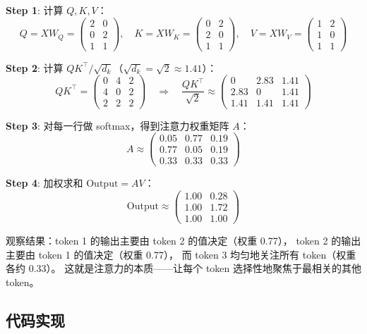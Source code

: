 \textbf{Step 1}: 计算 $Q, K, V$：
\[
Q = XW_Q = \begin{pmatrix} 2 & 0 \\ 0 & 2 \\ 1 & 1 \end{pmatrix}, \quad
K = XW_K = \begin{pmatrix} 0 & 2 \\ 2 & 0 \\ 1 & 1 \end{pmatrix}, \quad
V = XW_V = \begin{pmatrix} 1 & 2 \\ 1 & 0 \\ 1 & 1 \end{pmatrix}
\]

\textbf{Step 2}: 计算 $QK^\top / \sqrt{d_k}$（$\sqrt{d_k} = \sqrt{2} \approx 1.41$）：
\[
QK^\top = \begin{pmatrix} 0 & 4 & 2 \\ 4 & 0 & 2 \\ 2 & 2 & 2 \end{pmatrix}
\quad \Rightarrow \quad
\frac{QK^\top}{\sqrt{2}} \approx \begin{pmatrix} 0 & 2.83 & 1.41 \\ 2.83 & 0 & 1.41 \\ 1.41 & 1.41 & 1.41 \end{pmatrix}
\]

\textbf{Step 3}: 对每一行做 softmax，得到注意力权重矩阵 $A$：
\[
A \approx \begin{pmatrix}
  0.05 & 0.77 & 0.19 \\
  0.77 & 0.05 & 0.19 \\
  0.33 & 0.33 & 0.33
\end{pmatrix}
\]

\textbf{Step 4}: 加权求和 $\mathrm{Output} = AV$：
\[
\mathrm{Output} \approx \begin{pmatrix}
  1.00 & 0.28 \\
  1.00 & 1.72 \\
  1.00 & 1.00
\end{pmatrix}
\]

观察结果：token 1 的输出主要由 token 2 的值决定（权重 0.77），
token 2 的输出主要由 token 1 的值决定（权重 0.77），
而 token 3 均匀地关注所有 token（权重各约 0.33）。
这就是注意力的本质——让每个 token 选择性地聚焦于最相关的其他 token。

\subsection{代码实现}

